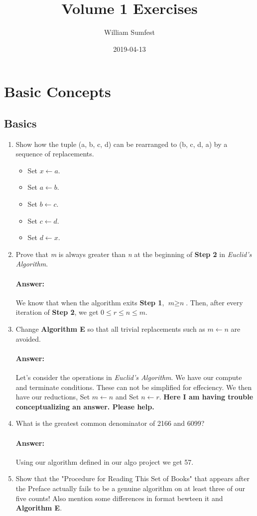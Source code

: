 \documentclass{article}
\title{Volume 1 Exercises}
\date{2019-04-13}
\author{William Sumfest}
\begin{document}
	\maketitle
	\newpage

	\section{Basic Concepts}
	\subsection{Basics}
	\begin{enumerate}
		\item Show how the tuple (a, b, c, d) can be rearranged to (b, c, d, a) by a sequence of replacements.
		\begin{itemize}
			\item Set $x \leftarrow a$.
			\item Set $a \leftarrow b$.
			\item Set $b \leftarrow c$.
			\item Set $c \leftarrow d$.
			\item Set $d \leftarrow x$.
		\end{itemize}
		\item Prove that \textit{m} is always greater than \textit{n} at the beginning of \textbf{Step 2} in \textit{Euclid's Algorithm}.
		\paragraph{Answer:}
		We know that when the algorithm exits \textbf{Step 1}, $\textit{m} \geq \textit{n}$. Then, after every iteration of \textbf{Step 2}, we get $0 \leq r \leq n \leq m$. 
		\item Change \textbf{Algorithm E} so that all trivial replacements such as $m \leftarrow n$ are avoided.
		\paragraph{Answer:}
		Let's consider the operations in \textit{Euclid's Algorithm}. We have our compute and terminate conditions. These can not be simplified for effeciency. We then have our reductions, Set $m \leftarrow n$ and Set $ n \leftarrow r$. \textbf{Here I am having trouble conceptualizing an answer. Please help.}
		\item What is the greatest common denominator of 2166 and 6099?
		\paragraph{Answer:}
		Using our algorithm defined in our algo project we get 57.
		\item Show that the "Procedure for Reading This Set of Books" that appears after the Preface actually fails to be a genuine algorithm on at least three of our five counts! Also mention some differences in format bewteen it and \textbf{Algorithm E}. 

\end{enumerate}
\end{document}
